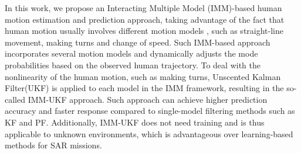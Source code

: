 \documentclass[letterpaper, 10 pt, conference]{ieeeconf}
\begin{document}
	In this work, we propose an Interacting Multiple Model (IMM)-based human motion estimation and prediction approach, taking advantage of the fact that human motion usually involves different motion models \cite{aggarwal1999human}, such as straight-line movement, making turns and change of speed.
	Such IMM-based approach incorporates several motion models and dynamically adjusts the mode probabilities based on the observed human trajectory.
	To deal with the nonlinearity of the human motion, such as making turns, Unscented Kalman Filter(UKF) is applied to each model in the IMM framework, resulting in the so-called IMM-UKF approach.
	Such approach can achieve higher prediction accuracy and faster response compared to single-model filtering methods such as KF and PF. 
	Additionally, IMM-UKF does not need training and is thus applicable to unknown environments, which is advantageous over learning-based methods for SAR missions.
	
\end{document}
